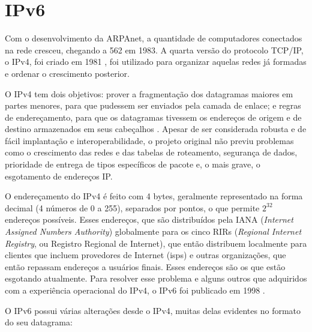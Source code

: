 
\section{IPv6}

Com o desenvolvimento da ARPAnet, a quantidade de computadores conectados na rede
cresceu, chegando a 562 em 1983. A quarta versão do protocolo TCP/IP, o IPv4, foi
criado em 1981 \cite{site:rfcipv4}, foi utilizado para organizar aquelas redes já
formadas e ordenar o crescimento posterior.

O IPv4 tem dois objetivos: prover a fragmentação dos datagramas maiores em partes
menores, para que pudessem ser enviados pela camada de enlace; e regras de
endereçamento, para que os datagramas tivessem os endereços de origem e de destino
armazenados em seus cabeçalhos \cite{site:nicipv4}. Apesar de ser considerada robusta e
de fácil implantação e interoperabilidade, o projeto original não previu problemas como
o crescimento das redes e das tabelas de roteamento, segurança de dados, prioridade de
entrega de tipos específicos de pacote e, o mais grave, o esgotamento de endereços IP.

O endereçamento do IPv4 é feito com 4 bytes, geralmente representado na forma decimal
(4 números de 0 a 255), separados por pontos, o que permite $2^32$ endereços possíveis.
Esses endereços, que são distribuídos pela IANA
(\emph{Internet Assigned Numbers Authority}) globalmente para os cinco RIRs
(\emph{Regional Internet Registry}, ou Registro Regional de Internet), que então
distribuem localmente para clientes que incluem provedores de Internet (\glspl{isp}) e
outras organizações, que então repassam endereços a usuários finais. Esses endereços
são os que estão esgotando atualmente. Para resolver esse problema e alguns outros que
adquiridos com a experiência operacional do IPv4, o IPv6 foi publicado em 1998
\cite{site:rfcipv6}.

O IPv6 possui várias alterações desde o IPv4, muitas delas evidentes no formato do seu
datagrama:

